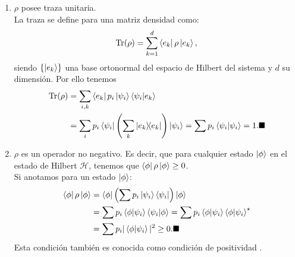 \documentclass[letterpaper,12pt]{thesisECFM}
\theoremstyle{plain}
\theoremstyle{definition}
\theoremstyle{definition}
\theoremstyle{remark}
\newcommand{\1}{\mathbb{1}}
\begin{document}
\begin{enumerate}
\item $\rho$ posee traza unitaria.\\
La traza se define para una matriz densidad como:
\begin{equation}
    \label{ec:1.18}
    \text{Tr}(\rho) = \sum_{k=1}^{d} \bra{e_k} \rho \ket{e_k},
\end{equation}
siendo $\{\ket{e_k}\}$ una base ortonormal del espacio de Hilbert del sistema y $d$ su
dimensión. Por ello tenemos
\begin{align}
    \text{Tr}(\rho) & = \sum_{i, k} \bra{e_k}p_i\ket{\psi_i} \braket{\psi_i}{e_k} \\
    & = \sum_i p_i \bra{\psi_i} \left(\sum_k \ketbra{e_k} \right) \ket{\psi_i}
= \sum{p_i} \braket{\psi_i} = 1.\blacksquare
\end{align}
\item $\rho$ es un operador no negativo. Es decir, que para cualquier estado $\ket{\phi}$ en el estado de Hilbert $\mathcal{H}$, tenemos que $\bra{\phi}\rho\ket{\phi} \geq 0$.\\
Si anotamos para un estado $\ket{\phi}$:
\begin{align}
\bra{\phi}\rho\ket{\phi} & = \bra{\phi} \left(\sum p_i \ket{\psi_i} \bra{\psi_i}   \right)     \ket{\phi}\\
& = \sum p_i \bra{\phi}\ket{\psi_i}\bra{\psi_i}\ket{\phi}  = \sum p_i \bra{\phi}\ket{\psi_i} \bra{\phi}\ket{\psi_i}^{\star}\\
& = \sum p_i |\bra{\phi}\ket{\psi_i}| ^2 \geq 0. \blacksquare
\end{align}  
Esta condición también es conocida como condición de positividad \cite{nielsen_chuang_2011}.
\end{enumerate}

\end{document}
